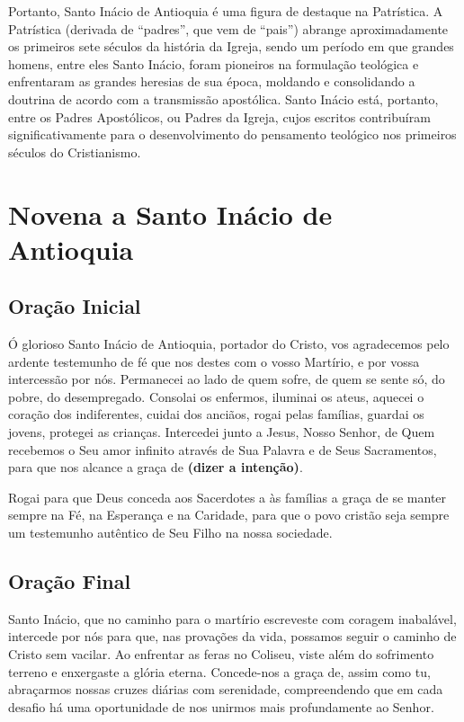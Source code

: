 \documentclass[a4paper,14pt]{extarticle} \usepackage[utf8]{inputenc}
\begin{document}
Portanto, Santo Inácio de Antioquia é uma figura de destaque na Patrística. A Patrística (derivada de “padres”, que vem de “pais”) abrange aproximadamente os primeiros sete séculos da história da Igreja, sendo um período em que grandes homens, entre eles Santo Inácio, foram pioneiros na formulação teológica e enfrentaram as grandes heresias de sua época, moldando e consolidando a doutrina de acordo com a transmissão apostólica. Santo Inácio está, portanto, entre os Padres Apostólicos, ou Padres da Igreja, cujos escritos contribuíram significativamente para o desenvolvimento do pensamento teológico nos primeiros séculos do Cristianismo.

\newpage

\section{Novena a Santo Inácio de Antioquia}

\subsection{Oração Inicial} \label{oracao-inicial}

Ó glorioso Santo Inácio de Antioquia, portador do Cristo, vos agradecemos pelo ardente testemunho de fé que nos destes com o vosso Martírio, e por vossa intercessão por nós. Permanecei ao lado de quem sofre, de quem se sente só, do pobre, do desempregado. Consolai os enfermos, iluminai os ateus, aquecei o coração dos indiferentes, cuidai dos anciãos, rogai pelas famílias, guardai os jovens, protegei as crianças. Intercedei junto a Jesus, Nosso Senhor, de Quem recebemos o Seu amor infinito através de Sua Palavra e de Seus Sacramentos, para que nos alcance a graça de \textbf{(dizer a intenção)}.

Rogai para que Deus conceda aos Sacerdotes a às famílias a graça de se manter sempre na Fé, na Esperança e na Caridade, para que o povo cristão seja sempre um testemunho autêntico de Seu Filho na nossa sociedade. 

\subsection{Oração Final} \label{oracao-final}

Santo Inácio, que no caminho para o martírio escreveste com coragem inabalável, intercede por nós para que, nas provações da vida, possamos seguir o caminho de Cristo sem vacilar. Ao enfrentar as feras no Coliseu, viste além do sofrimento terreno e enxergaste a glória eterna. Concede-nos a graça de, assim como tu, abraçarmos nossas cruzes diárias com serenidade, compreendendo que em cada desafio há uma oportunidade de nos unirmos mais profundamente ao Senhor.
\end{document}
